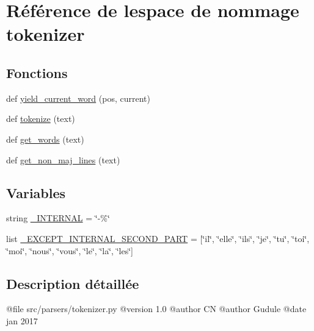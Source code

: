 \hypertarget{namespacetokenizer}{}\section{Référence de l\textquotesingle{}espace de nommage tokenizer}
\label{namespacetokenizer}
\subsection*{Fonctions}
\begin{DoxyCompactItemize}
\item 
def \hyperlink{namespacetokenizer_a30cb15b0950de4e8a9b00b1a42852ddb}{yield\+\_\+current\+\_\+word} (pos, current)
\item 
def \hyperlink{namespacetokenizer_a96fa776f6a9120b05064accccb320156}{tokenize} (text)
\item 
def \hyperlink{namespacetokenizer_af24eead26991dd3491ff67e6c68dab0f}{get\+\_\+words} (text)
\item 
def \hyperlink{namespacetokenizer_a336237c2ca352ce8d955661a22099326}{get\+\_\+non\+\_\+maj\+\_\+lines} (text)
\end{DoxyCompactItemize}
\subsection*{Variables}
\begin{DoxyCompactItemize}
\item 
string \hyperlink{namespacetokenizer_a5c2d26110082282c1eb766a0a71dfc9d}{\+\_\+\+I\+N\+T\+E\+R\+N\+A\+L} = \char`\"{}-\/\%\char`\"{}
\item 
list \hyperlink{namespacetokenizer_aa94519b0cea3d01e281f543a1d2a4d2f}{\+\_\+\+E\+X\+C\+E\+P\+T\+\_\+\+I\+N\+T\+E\+R\+N\+A\+L\+\_\+\+S\+E\+C\+O\+N\+D\+\_\+\+P\+A\+R\+T} = \mbox{[}\char`\"{}il\char`\"{}, \char`\"{}elle\char`\"{}, \char`\"{}ils\char`\"{}, \char`\"{}je\char`\"{}, \char`\"{}tu\char`\"{}, \char`\"{}toi\char`\"{}, \char`\"{}moi\char`\"{}, \char`\"{}nous\char`\"{}, \char`\"{}vous\char`\"{}, \char`\"{}le\char`\"{}, \char`\"{}la\char`\"{}, \char`\"{}les\char`\"{}\mbox{]}
\end{DoxyCompactItemize}


\subsection{Description détaillée}
\begin{DoxyVerb}@file src/parsers/tokenizer.py
@version 1.0
@author CN
@author Gudule
@date jan 2017\end{DoxyVerb}
 

